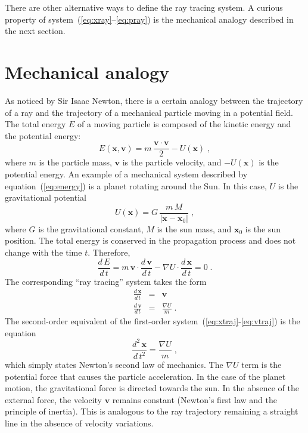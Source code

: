 There are other alternative ways to define the ray tracing system. A
curious property of system~(\ref{eq:xray}--\ref{eq:pray}) is the
mechanical analogy described in the next section.

\section{Mechanical analogy}
As noticed by Sir Isaac Newton, there is a certain analogy between the
trajectory of a ray and the trajectory of a mechanical particle moving
in a potential field. The total energy $E$ of a moving particle is
composed of the kinetic energy and the potential energy:
\begin{equation}
  \label{eq:energy}
  E(\mathbf{x},\mathbf{v}) = m\,\frac{\mathbf{v} \cdot
    \mathbf{v}}{2} - U(\mathbf{x})\;,
\end{equation}
where $m$ is the particle mass, $\mathbf{v}$ is the particle velocity,
and $- U(\mathbf{x})$ is the potential energy. An example of a
mechanical system described by equation~(\ref{eq:energy}) is a planet
rotating around the Sun. In this case, $U$ is the gravitational
potential
\begin{equation}
  \label{eq:sun}
  U(\mathbf{x}) = G\,\frac{m\,M}{|\mathbf{x}-\mathbf{x}_0|}\;,
\end{equation}
where $G$ is the gravitational constant, $M$ is the sun mass, and
$\mathbf{x}_0$ is the sun position.
The total energy is conserved in the propagation process and does not
change with the time $t$. Therefore,
\begin{equation}
  \label{eq:dt}
  \frac{d\,E}{d\,t} = m\,\mathbf{v} \cdot
  \frac{d\,\mathbf{v}}{d\,t} - \nabla U \cdot
  \frac{d\,\mathbf{x}}{d\,t} = 0\;.
\end{equation}
The corresponding ``ray tracing'' system
takes the form
\begin{eqnarray}
  \label{eq:xtraj}
  \frac{d\,\mathbf{x}}{d\,t} & = & \mathbf{v} \\
  \label{eq:vtraj}
  \frac{d\,\mathbf{v}}{d\,t} & = & \frac{\nabla U}{m}\;.
\end{eqnarray}
The second-order equivalent of the first-order
system~(\ref{eq:xtraj}-\ref{eq:vtraj}) is the equation
\begin{equation}
  \label{eq:xtraj2}
  \frac{d^2\,\mathbf{x}}{d\,t^2} = \frac{\nabla U}{m}\;,
\end{equation}
which simply states Newton's second law of mechanics. The $\nabla U$
term is the potential force that causes the particle acceleration. In
the case of the planet motion, the gravitational force is directed
towards the sun. In the absence of the external force, the velocity
$\mathbf{v}$ remains constant (Newton's first law and the principle of
inertia). This is analogous to the ray trajectory remaining a straight
line in the absence of velocity variations.

